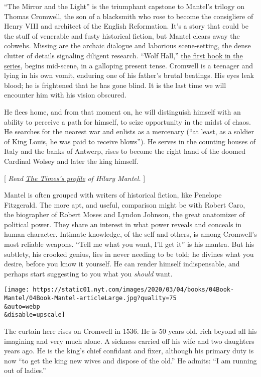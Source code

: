 ``The Mirror and the Light'' is the triumphant capstone to Mantel's
trilogy on Thomas Cromwell, the son of a blacksmith who rose to become
the consigliere of Henry VIII and architect of the English Reformation.
It's a story that could be the stuff of venerable and fusty historical
fiction, but Mantel clears away the cobwebs. Missing are the archaic
dialogue and laborious scene-setting, the dense clutter of details
signaling diligent research. ``Wolf Hall,''
\href{https://www.nytimes.com/2009/10/05/books/05maslin.html}{the first
book in the series}, begins mid-scene, in a galloping present tense.
Cromwell is a teenager and lying in his own vomit, enduring one of his
father's brutal beatings. His eyes leak blood; he is frightened that he
has gone blind. It is the last time we will encounter him with his
vision obscured.

He flees home, and from that moment on, he will distinguish himself with
an ability to perceive a path for himself, to seize opportunity in the
midst of chaos. He searches for the nearest war and enlists as a
mercenary (``at least, as a soldier of King Louis, he was paid to
receive blows''). He serves in the counting houses of Italy and the
banks of Antwerp, rises to become the right hand of the doomed Cardinal
Wolsey and later the king himself.

{[} \emph{Read}
\href{https://www.nytimes.com/2020/02/24/books/hilary-mantel-mirror-and-the-light-thomas-cromwell.html}{\emph{The
Times's profile}} \emph{of Hilary Mantel.} {]}

Mantel is often grouped with writers of historical fiction, like
Penelope Fitzgerald. The more apt, and useful, comparison might be with
Robert Caro, the biographer of Robert Moses and Lyndon Johnson, the
great anatomizer of political power. They share an interest in what
power reveals and conceals in human character. Intimate knowledge, of
the self and others, is among Cromwell's most reliable weapons. ``Tell
me what you want, I'll get it'' is his mantra. But his subtlety, his
crooked genius, lies in never needing to be told; he divines what you
desire, before you know it yourself. He can render himself
indispensable, and perhaps start suggesting to you what you
\emph{should} want.

\texttt{[image: https://static01.nyt.com/images/2020/03/04/books/04Book-Mantel/04Book-Mantel-articleLarge.jpg?quality=75\\\&auto=webp\\\&disable=upscale]}

The curtain here rises on Cromwell in 1536. He is 50 years old, rich
beyond all his imagining and very much alone. A sickness carried off his
wife and two daughters years ago. He is the king's chief confidant and
fixer, although his primary duty is now ``to get the king new wives and
dispose of the old.'' He admits: ``I am running out of ladies.''

